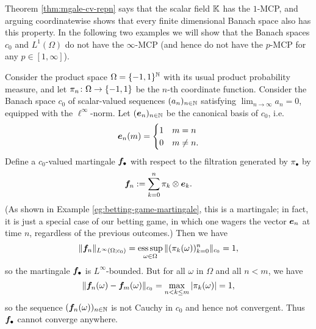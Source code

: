 Theorem \ref{thm:mgale-cv-repn} says that the scalar field $\mathbb{K}$ has the $1$-MCP, and arguing coordinatewise shows that every finite dimensional Banach space also has this property.
In the following two examples we will show that the Banach spaces $c_0$ and $L^1(\Omega)$ do not have the $\infty$-MCP (and hence do not have the $p$-MCP for any $p \in [1,\infty]$). 

\begin{example}\label{eg:c0-noMCP}
  Consider the product space $\Omega = \{-1,1\}^{\mathbb{N}}$ with its usual product probability measure, and let $\pi_n \colon \Omega \rightarrow \{-1,1\}$ be the $n$-th coordinate function.
  Consider the Banach space $c_0$ of scalar-valued sequences $(a_n)_{n \in \mathbb{N}}$ satisfying $\lim_{n \to \infty} a_n = 0$, equipped with the $\ell^\infty$-norm.
  Let $(\bm{e}_n)_{n \in \mathbb{N}}$ be the canonical basis of $c_0$, i.e.
  \begin{equation*}
    \bm{e}_n(m) = \begin{cases} 1 & m=n \\ 0 & m \neq n. \end{cases}
  \end{equation*}
  Define a $c_0$-valued martingale $\bm{f}_\bullet$ with respect to the filtration generated by $\pi_{\bullet}$ by
  \begin{equation*}
    \bm{f}_n := \sum_{k = 0}^{n} \pi_k \otimes \bm{e}_k.
  \end{equation*} 
  (As shown in Example \ref{eg:betting-game-martingale}, this is a martingale; in fact, it is just a special case of our betting game, in which one wagers the vector $\bm{e}_n$ at time $n$, regardless of the previous outcomes.)
  Then we have
  \begin{equation*}
    \|\bm{f}_n\|_{L^\infty(\Omega;c_0)} = \operatorname*{ess\,sup}_{\omega \in \Omega} \|(\pi_k(\omega))_{k = 0}^n\|_{c_0} = 1,
  \end{equation*}
  so the martingale $\bm{f}_{\bullet}$ is $L^\infty$-bounded.
  But for all $\omega$ in $\Omega$ and all $n < m$, we have
  \begin{equation*}
    \|\bm{f}_n(\omega) - \bm{f}_m(\omega)\|_{c_0} = \max_{n < k \leq m} |\pi_k(\omega)| = 1,
  \end{equation*}
  so the sequence $(\bm{f}_n(\omega))_{n \in \mathbb{N}}$ is not Cauchy in $c_0$ and hence not convergent.
  Thus $\bm{f}_{\bullet}$ cannot converge anywhere.
\end{example}

